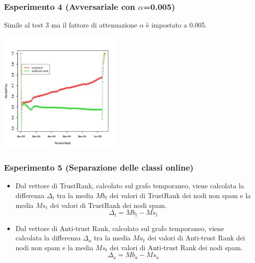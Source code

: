 \documentclass{beamer}
\begin{document}
\begin{frame}
\frametitle{Esperimento 4 {\tiny(Avversariale con \(\alpha\)=0.005)}}
Simile al test 3 ma il fattore di attenuazione \(\alpha\)  è impostato a 0.005.
   \begin{center}
 \includegraphics[height=6cm]{immagini/test4/coplotTrustAnti_Mode1_set3776_62_alpha0005}
\end{center}
\end{frame}
\begin{frame}
\frametitle{Esperimento 5 {\tiny(Separazione delle classi online)}}
\begin{itemize}
 \item Dal vettore di TrustRank,  calcolato sul grafo temporaneo, viene calcolata la differenza \(\Delta_t\) tra la media \(Mb_t\) dei valori di TrustRank dei nodi non spam e la media \(Ms_t\) dei valori di TrustRank dei nodi spam.
 \begin{equation}
 \Delta_t = Mb_t-Ms_t
\end{equation}
  \item Dal vettore di Anti-trust Rank,  calcolato sul grafo temporaneo, viene calcolata la differenza \(\Delta_a\) tra la media \(Ma_t\) dei valori di Anti-trust Rank dei nodi non spam e la media \(Ms_t\) dei valori di Anti-trust Rank dei nodi spam.
  \begin{equation}
 \Delta_a=Mb_a-Ms_a
\end{equation}
\end{itemize}
\end{frame}
\end{document}
